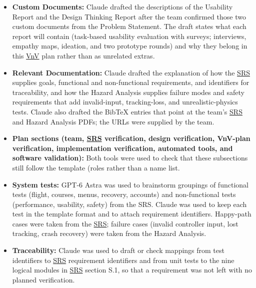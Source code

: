 \documentclass[12pt, titlepage]{article}
\begin{document}
\begin{enumerate}
\begin{itemize}
        \item \textbf{Custom Documents:} Claude drafted the descriptions of
        the Usability Report and the Design Thinking Report after the team
        confirmed those two custom documents from the Problem Statement.
        The draft states what each report will contain (task-based
        usability evaluation with surveys; interviews, empathy maps,
        ideation, and two prototype rounds) and why they belong in this
        \hyperlink{abbr:VnV}{VnV} plan rather than as unrelated extras.

        \item \textbf{Relevant Documentation:} Claude drafted the
        explanation of how the \hyperlink{abbr:SRS}{SRS} supplies goals, functional and
        non-functional requirements, and identifiers for traceability, and
        how the Hazard Analysis supplies failure modes and safety
        requirements that add invalid-input, tracking-loss, and
        unrealistic-physics tests. Claude also drafted the BibTeX entries
        that point at the team's \hyperlink{abbr:SRS}{SRS} and Hazard Analysis PDFs; the URLs
        were supplied by the team.

        \item \textbf{Plan sections (team, \hyperlink{abbr:SRS}{SRS} verification, design
        verification, VnV-plan verification, implementation verification,
        automated tools, and software validation):} Both tools were used
        to check that these subsections still follow the template (roles
        rather than a name list. 

        \item \textbf{System tests:} GPT-6 Astra was used to brainstorm
        groupings of functional tests (flight, courses, menus, recovery,
        accounts) and non-functional tests (performance, usability,
        safety) from the SRS. Claude was used to keep each test in the
        template format and to attach requirement identifiers. Happy-path
        cases were taken from the \hyperlink{abbr:SRS}{SRS}; failure cases (invalid controller
        input, lost tracking, crash recovery) were taken from the Hazard
        Analysis.

        \item \textbf{Traceability:} Claude was used to draft or check
        mappings from test identifiers to \hyperlink{abbr:SRS}{SRS} requirement identifiers and
        from unit tests to the nine logical modules in \hyperlink{abbr:SRS}{SRS} section S.1, so
        that a requirement was not left with no planned verification.


\end{itemize}
\end{enumerate}
\end{document}
